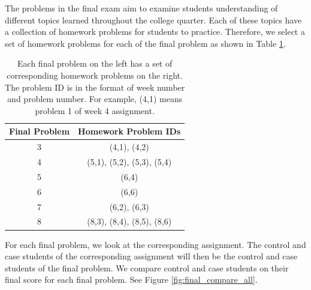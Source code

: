 \documentclass{sigchi}
\begin{document}
The problems in the final exam aim to examine students understanding of different topics learned throughout the college quarter. Each of these topics have a collection of homework problems for students to practice. Therefore, we select a set of homework problems for each of the final problem as shown in Table \ref{tab:map}.

\begin{table}[h]
\caption{Each final problem on the left has a set of corresponding homework problems on the right. The problem ID is in the format of week number and problem number. For example, (4,1) means problem 1 of week 4 assignment.}
\begin{center}
  \begin{tabular}{ c | c }
   Final Problem & Homework Problem IDs \\ \hline
	3 & (4,1), (4,2) \\
	4 & (5,1), (5,2), (5,3), (5,4) \\
    5 & (6,4) \\
    6 & (6,6) \\
    7 & (6,2), (6,3) \\
    8 & (8,3), (8,4), (8,5), (8,6) \\ \hline
  \end{tabular}
  \label{tab:map}
  \end{center}
\end{table}

For each final problem, we look at the corresponding assignment. The control and case students of the corresponding assignment will then be the control and case students of the final problem. We compare control and case students on their final score for each final problem. See Figure \ref{fig:final_compare_all}.

\end{document}
